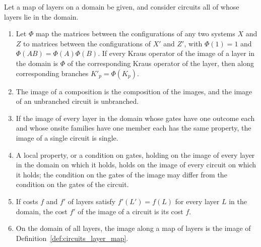 \begin{theorem}
    \label{thm:circuits_map_layers_on}
    \leanok
    Let a map of layers on a domain be given, and consider circuits all of whose layers lie
    in the domain.
    \begin{enumerate}
        \item Let $\Phi$ map the matrices between the configurations of any two systems $X$
              and $Z$ to matrices between the configurations of $X'$ and $Z'$, with
              $\Phi(1)=1$ and $\Phi(AB)=\Phi(A)\Phi(B)$. If every Kraus operator of the
              image of a layer in the domain is $\Phi$ of the corresponding Kraus operator
              of the layer, then along corresponding branches $K'_p=\Phi(K_p)$.
        \item The image of a composition is the composition of the images, and the image
              of an unbranched circuit is unbranched.
        \item If the image of every layer in the domain whose gates have one outcome each
              and whose onsite families have one member each has the same property, the
              image of a single circuit is single.
        \item A local property, or a condition on gates, holding on the image of every
              layer in the domain on which it holds, holds on the image of every circuit on
              which it holds; the condition on the gates of the image may differ from the
              condition on the gates of the circuit.
        \item If costs $f$ and $f'$ of layers satisfy $f'(L')=f(L)$ for every layer $L$ in
              the domain, the cost $f'$ of the image of a circuit is its cost $f$.
        \item On the domain of all layers, the image along a map of layers is the image of
              Definition~\ref{def:circuits_layer_map}.
    \end{enumerate}
\end{theorem}
